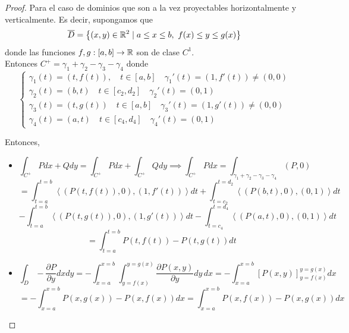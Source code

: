 \begin{proof}
    Para el caso de dominios que son a la vez proyectables horizontalmente y verticalmente. Es decir, supongamos que
    $$\overline{D} = \left\{ (x,y) \in \mathbb{R}^2 \mid a \leq x \leq b, \ f(x) \leq y \leq g(x) \right\}$$
    donde las funciones $f,g: [a,b] \to \mathbb{R}$ son de clase $C^1$.\\
    Entonces $C^+ = \gamma_1 + \gamma_2 - \gamma_3 - \gamma_4$ donde
    $$\begin{cases}
            \gamma_1(t) = (t, f(t)), \quad t \in [a,b] \quad \gamma_1'(t) = (1, f'(t)) \neq (0,0) \\
            \gamma_2(t) = (b,t) \quad t \in [c_2, d_2] \quad \gamma_2'(t) = (0,1)                 \\
            \gamma_3(t) = (t, g(t)) \quad t \in [a,b] \quad \gamma_3'(t) = (1, g'(t)) \neq (0,0)  \\
            \gamma_4(t) = (a,t) \quad t \in [c_4, d_4] \quad \gamma_4'(t) = (0,1)
        \end{cases}$$

    Entonces,

    \begin{itemize}
        \item
              \[
                  \int_{C^+} Pdx + Qdy = \int_{C^+} Pdx + \int_{C^+} Qdy
                  \implies \int_{C^+} Pdx = \int_{\gamma_1+\gamma_2-\gamma_3-\gamma_4} (P,0)
              \]
              \[
                  = \int_{t=a}^{t=b} \left\langle (P(t,f(t)), 0), (1, f'(t)) \right\rangle dt
                  + \int_{t=c_2}^{t=d_2} \left\langle (P(b,t), 0), (0,1) \right\rangle dt
              \]
              \[
                  - \int_{t=a}^{t=b} \left\langle (P(t,g(t)), 0), (1, g'(t)) \right\rangle dt
                  - \int_{t=c_4} ^{t=d_4} \left\langle (P(a,t), 0), (0,1) \right\rangle dt
              \]
              \[
                  = \int_{t=a}^{t=b} P(t,f(t)) - P(t,g(t)) dt
              \]

        \item
              \[
                  \int_{D} -\frac{\partial P}{\partial y}dxdy
                  = -\int_{x=a}^{x=b} \int_{y=f(x)}^{y=g(x)} \frac{\partial P(x,y)}{\partial y} dy \,dx
                  = -\int_{x=a}^{x=b} \left[ P(x,y) \right] _{y=f(x)}^{y=g(x)} dx
              \]
              \[
                  = -\int_{x=a}^{x=b} P(x,g(x)) - P(x,f(x)) dx
                  = \int_{x=a}^{x=b} P(x,f(x)) - P(x,g(x)) dx
              \]
    \end{itemize}


\end{proof}
